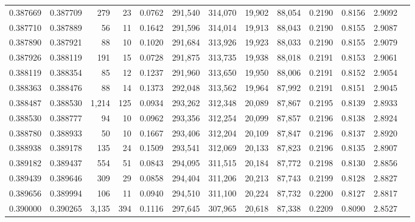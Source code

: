 \begin{tabular}{rrrrrrrrrrrrr}
0.387669 & 0.387709 &   279 &  23 &                                     0.0762 & 291,540 & 314,070 &  19,902 &  88,054 & 0.2190 & 0.8156 & 2.9092 \\
0.387710 & 0.387889 &    56 &  11 &                                     0.1642 & 291,596 & 314,014 &  19,913 &  88,043 & 0.2190 & 0.8155 & 2.9087 \\
0.387890 & 0.387921 &    88 &  10 &                                     0.1020 & 291,684 & 313,926 &  19,923 &  88,033 & 0.2190 & 0.8155 & 2.9079 \\
0.387926 & 0.388119 &   191 &  15 &                                     0.0728 & 291,875 & 313,735 &  19,938 &  88,018 & 0.2191 & 0.8153 & 2.9061 \\
0.388119 & 0.388354 &    85 &  12 &                                     0.1237 & 291,960 & 313,650 &  19,950 &  88,006 & 0.2191 & 0.8152 & 2.9054 \\
0.388363 & 0.388476 &    88 &  14 &                                     0.1373 & 292,048 & 313,562 &  19,964 &  87,992 & 0.2191 & 0.8151 & 2.9045 \\
0.388487 & 0.388530 & 1,214 & 125 &                                     0.0934 & 293,262 & 312,348 &  20,089 &  87,867 & 0.2195 & 0.8139 & 2.8933 \\
0.388530 & 0.388777 &    94 &  10 &                                     0.0962 & 293,356 & 312,254 &  20,099 &  87,857 & 0.2196 & 0.8138 & 2.8924 \\
0.388780 & 0.388933 &    50 &  10 &                                     0.1667 & 293,406 & 312,204 &  20,109 &  87,847 & 0.2196 & 0.8137 & 2.8920 \\
0.388938 & 0.389178 &   135 &  24 &                                     0.1509 & 293,541 & 312,069 &  20,133 &  87,823 & 0.2196 & 0.8135 & 2.8907 \\
0.389182 & 0.389437 &   554 &  51 &                                     0.0843 & 294,095 & 311,515 &  20,184 &  87,772 & 0.2198 & 0.8130 & 2.8856 \\
0.389439 & 0.389646 &   309 &  29 &                                     0.0858 & 294,404 & 311,206 &  20,213 &  87,743 & 0.2199 & 0.8128 & 2.8827 \\
0.389656 & 0.389994 &   106 &  11 &                                     0.0940 & 294,510 & 311,100 &  20,224 &  87,732 & 0.2200 & 0.8127 & 2.8817 \\
0.390000 & 0.390265 & 3,135 & 394 &                                     0.1116 & 297,645 & 307,965 &  20,618 &  87,338 & 0.2209 & 0.8090 & 2.8527 \\

\end{tabular}
